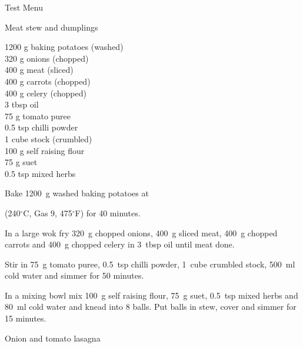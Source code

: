\begin{menu}{Test Menu}
    \begin{recipe}{2}{Meat stew and dumplings}%
    
		\begin{ingredients}
		1200 g baking potatoes (washed) \\
	320 g onions (chopped) \\
	400 g meat (sliced) \\
	400 g carrots (chopped) \\
	400 g celery (chopped) \\
	3 tbsp oil  \\
	75 g tomato puree  \\
	0.5 tsp chilli powder  \\
	1 cube stock (crumbled) \\
	100 g self raising flour  \\
	75 g suet  \\
	0.5 tsp mixed herbs  \\
	
		\end{ingredients}
	
	
	
    \begin{instructions}
    \item 
      Bake 1200~g washed baking potatoes
      at
      
      (240$^{\circ}$C, Gas 9, 475$^{\circ}$F)
     for 40 minutes.
    \item 
        In a large wok fry
        320~g chopped onions,
        400~g sliced meat,
        400~g chopped carrots
        and
        400~g chopped celery
        in
        3~tbsp  oil
        until meat done.
      \item 
        Stir in
        75~g  tomato puree,
        0.5~tsp  chilli powder,
        1~cube crumbled stock,
        500~ml  cold water
        and simmer for 50 minutes.
      \item 
        In a mixing bowl mix
        100~g  self raising flour,
        75~g  suet,
        0.5~tsp  mixed herbs
        and
        80~ml  cold water
        and knead into 8 balls.
        Put balls in stew, cover and
        simmer for 15 minutes.
      
    \end{instructions}
    \end{recipe}%
  
    \begin{recipe}{2}{Onion and tomato lasagna}%
    

\end{recipe}
\end{menu}
